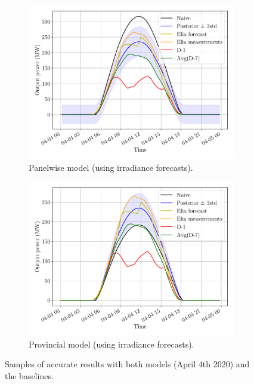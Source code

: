 \documentclass[a4paper, 12pt]{article}
\begin{document}
\begin{figure}[H]
	\centering
	\begin{subfigure}{0.48\textwidth}
		\centering
		\includegraphics[width=\textwidth]{resources/pdf/solar_panelwise_START_FOR_04-04-2020.pdf}
		\caption{Panelwise model (using irradiance forecasts).}
		\label{fig:panelwise_good_1}
	\end{subfigure}
	\hspace{0.5em}
	\begin{subfigure}{0.48\textwidth}
		\centering
		\includegraphics[width=\textwidth]{resources/pdf/solar_provincial_START_FOR_04-04-2020.pdf}
		\caption{Provincial model (using irradiance forecasts).}
		\label{fig:provincial_good_1}
	\end{subfigure}
	\caption{Samples of accurate results with both models (April 4th 2020) and the baselines.}
	\label{fig:good_results_april_4th}
\end{figure}
\end{document}
